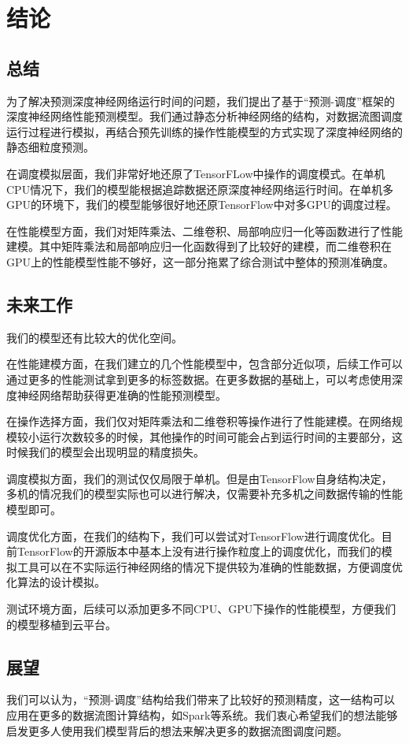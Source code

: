 \chapter{结论}
\section{总结}
\label{cha:conc}
    为了解决预测深度神经网络运行时间的问题，我们提出了基于“预测-调度”框架的深度神经网络性能预测模型。我们通过静态分析神经网络的结构，对数据流图调度运行过程进行模拟，再结合预先训练的操作性能模型的方式实现了深度神经网络的静态细粒度预测。
    
    在调度模拟层面，我们非常好地还原了TensorFLow中操作的调度模式。在单机CPU情况下，我们的模型能根据追踪数据还原深度神经网络运行时间。在单机多GPU的环境下，我们的模型能够很好地还原TensorFlow中对多GPU的调度过程。
    
    在性能模型方面，我们对矩阵乘法、二维卷积、局部响应归一化等函数进行了性能建模。其中矩阵乘法和局部响应归一化函数得到了比较好的建模，而二维卷积在GPU上的性能模型性能不够好，这一部分拖累了综合测试中整体的预测准确度。
    
\section{未来工作}
    我们的模型还有比较大的优化空间。
    
    在性能建模方面，在我们建立的几个性能模型中，包含部分近似项，后续工作可以通过更多的性能测试拿到更多的标签数据。在更多数据的基础上，可以考虑使用深度神经网络帮助获得更准确的性能预测模型。
    
    在操作选择方面，我们仅对矩阵乘法和二维卷积等操作进行了性能建模。在网络规模较小运行次数较多的时候，其他操作的时间可能会占到运行时间的主要部分，这时候我们的模型会出现明显的精度损失。
    
    调度模拟方面，我们的测试仅仅局限于单机。但是由TensorFlow自身结构决定，多机的情况我们的模型实际也可以进行解决，仅需要补充多机之间数据传输的性能模型即可。
    
    调度优化方面，在我们的结构下，我们可以尝试对TensorFlow进行调度优化。目前TensorFlow的开源版本中基本上没有进行操作粒度上的调度优化，而我们的模拟工具可以在不实际运行神经网络的情况下提供较为准确的性能数据，方便调度优化算法的设计模拟。
    
    测试环境方面，后续可以添加更多不同CPU、GPU下操作的性能模型，方便我们的模型移植到云平台。
    
\section{展望}

    我们可以认为，“预测-调度”结构给我们带来了比较好的预测精度，这一结构可以应用在更多的数据流图计算结构，如Spark\cite{rdd}等系统。我们衷心希望我们的想法能够启发更多人使用我们模型背后的想法来解决更多的数据流图调度问题。
    
